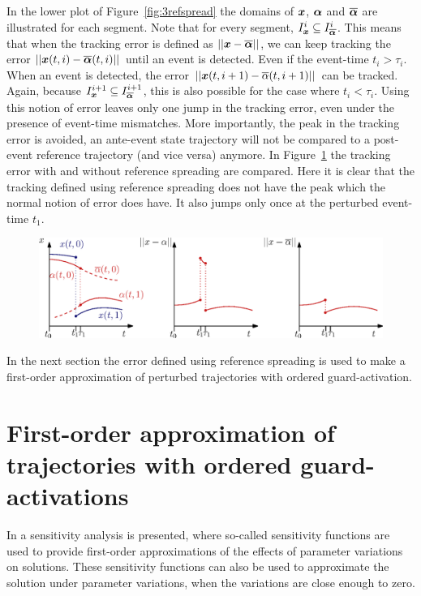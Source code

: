 \documentclass[../DC2017114Bouma.tex]{subfiles}
\begin{document}
In the lower plot of Figure~\ref{fig:3refspread} the domains of ${\boldsymbol{x}}$, $\boldsymbol{\alpha}$ and $\overline{\boldsymbol{\alpha}}$ are illustrated for each segment. Note that for every segment, $I_{{\boldsymbol{x}}}^i\subseteq I_{\overline{\boldsymbol{\alpha}}}^i$. This means that when the tracking error is defined as $||{\boldsymbol{x}}-\overline{\boldsymbol{\alpha}}||$, we can keep tracking the error $||{\boldsymbol{x}}(t,i)-\overline{\boldsymbol{\alpha}}(t,i)||$ until an event is detected. Even if the event-time $t_i>\tau_i$. When an event is detected, the error  $||{\boldsymbol{x}}(t,i+1)-\overline{\alpha}(t,i+1)||$ can be tracked. Again, because $I_{{\boldsymbol{x}}}^{i+1}\subseteq I_{\overline{\boldsymbol{\alpha}}}^{i+1}$, this is also possible for the case where $t_i<\tau_i$. Using this notion of error leaves only one jump in the tracking error, even under the presence of event-time mismatches. More importantly, the peak in the tracking error is avoided, an ante-event state trajectory will not be compared to a post-event reference trajectory (and vice versa) anymore. In Figure~\ref{fig:3refspreaderrors} the tracking error with and without reference spreading are compared. Here it is clear that the tracking defined using reference spreading does not have the peak which the normal notion of error does have. It also jumps only once at the perturbed event-time $t_1$.
\begin{figure}[h]
\centering
\includegraphics[width=\textwidth]{refspreaderrors.eps}\caption{} \label{fig:3refspreaderrors}
\end{figure}

In the next section the error defined using reference spreading is used to make a first-order approximation of perturbed trajectories with ordered guard-activation.

\section{First-order approximation of trajectories with ordered guard-activations}
In \cite{Khalil1996} a sensitivity analysis is presented, where so-called sensitivity functions are used to provide first-order approximations of the effects of parameter variations on solutions. These sensitivity functions can also be used to approximate the solution under parameter variations, when the variations are close enough to zero. 
\end{document}
